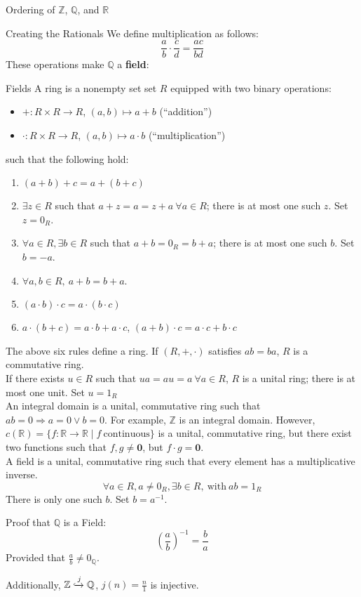 \documentclass[10pt]{extarticle}
\newcommand{\Q}{\mathbb{Q}}
\newcommand{\Z}{\mathbb{Z}}
\newcommand{\R}{\mathbb{R}}
\begin{document}
\begin{problem}{Ordering of $\Z$, $\Q$, and $\R$}
\begin{problem}{Creating the Rationals}
      We define multiplication as follows:
      \[
        \frac{a}{b} \cdot \frac{c}{d} = \frac{ac}{bd}
      \] 
      These operations make $\Q$ a \textbf{field}:
      \begin{problem}{Fields}
        A ring is a nonempty set set $R$ equipped with two binary operations:
        \begin{itemize}
          \item $+: R\times R \rightarrow R$, $(a,b) \mapsto a+b$ (``addition'')
          \item $\cdot: R\times R \rightarrow R$, $(a,b) \mapsto a\cdot b$ (``multiplication'')
        \end{itemize}
        such that the following hold:
        \begin{enumerate}[(1)]
          \item $(a+b)+c = a+(b+c)$
          \item $\exists z\in R$ such that $a+z = a = z+a~\forall a\in R$; there is at most one such $z$. Set $z = 0_R$.
          \item $\forall a\in R,\exists b\in R$ such that $a+b = 0_R = b+a$; there is at most one such $b$. Set $b = -a$.
          \item $\forall a,b\in R,~a+b = b+a$.
          \item $(a\cdot b)\cdot c = a\cdot(b\cdot c)$
          \item $a\cdot(b+c) = a\cdot b + a\cdot c$, $(a+b)\cdot c = a\cdot c + b\cdot c$
        \end{enumerate}
        The above six rules define a ring. If $(R,+,\cdot)$ satisfies $ab = ba$, $R$ is a commutative ring.\\

        If there exists $u\in R$ such that $ua = au = a~\forall a\in R$, $R$ is a unital ring; there is at most one unit. Set $u = 1_R$\\

        An integral domain is a unital, commutative ring such that $ab = 0 \Rightarrow a=0\vee b=0$. For example, $\Z$ is an integral domain. However, $c(\R) = \{f:\R \rightarrow \R\mid f~\text{continuous}\}$ is a unital, commutative ring, but there exist two functions such that $f,g\neq \mathbf{0}$, but $f\cdot g = \mathbf{0}$.\\

        A field is a unital, commutative ring such that every element has a multiplicative inverse.
        \[
          \forall a\in R, a\neq 0_R,\exists b\in R,~\text{with}~ab = 1_R
        \] 
        There is only one such $b$. Set $b = a^{-1}$.
      \end{problem}
      \begin{problem}{Proof that $\Q$ is a Field:}
        \[
          \left(\frac{a}{b}\right)^{-1} = \frac{b}{a}
        \] 
        Provided that $\frac{a}{b}\neq 0_{\Q}$.
      \end{problem}
      Additionally, $\Z\xhookrightarrow{j}\Q$, $j(n) = \frac{n}{1}$ is injective.
    \end{problem}
  \end{problem}
\end{document}
